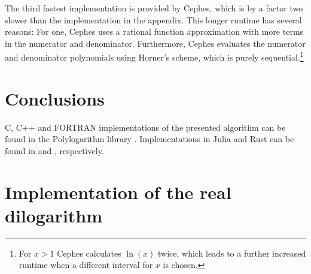 \documentclass[10pt,DIV16,twocolumn,numbers=noenddot]{scrartcl}
\begin{document}
The third fastest implementation is provided by Cephes, which is by a
factor two slower than the implementation in the appendix.  This
longer runtime has several reasons: For one, Cephes uses a rational
function approximation with more terms in the numerator and
denominator.  Furthermore, Cephes evaluates the numerator and
denominator polynomials using Horner's scheme, which is purely
sequential.\footnote{For $x>1$ Cephes calculates $\ln(x)$ twice, which
  leads to a further increased runtime when a different interval for
  $x$ is chosen.}

\section{Conclusions}

C, C++ and FORTRAN implementations of the presented algorithm can be
found in the Polylogarithm library \cite{polylogarithm}.
Implementations in Julia and Rust can be found in \cite{PolyLog.jl}
and \cite{polylog}, respectively.

\appendix

\section{Implementation of the real dilogarithm}






\end{document}

